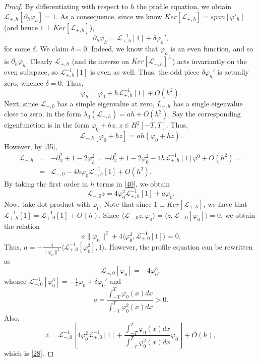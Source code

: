 \documentclass[12pt]{amsart}
\theoremstyle{definition}
\theoremstyle{remark}
\numberwithin{equation}{section}
\renewcommand{\(}{\left(}
\renewcommand{\)}{\right)}
\renewcommand{\[}{\left[}
\renewcommand{\]}{\right]}
\newcommand{\f}[2]{\frac{#1}{#2}}
\newcommand{\cl}{{\mathcal L}}
\newcommand{\de}{\delta}
\newcommand{\la}{\lambda}
\newcommand{\vp}{\varphi}
\newcommand{\dpr}[2]{\langle #1,#2 \rangle}
\newcommand{\p}{\partial}
\begin{document}
 \begin{proof}
 By differentiating with respect to $h$ the profile equation, we obtain $\cl_{+,h}[\p_h \vp_h]=1$. As a consequence, since we know $Ker[\cl_{+,h}]=span[\vp'_h]$ (and hence $1\perp Ker[\cl_{+,h}]$),
 $$
 \p_h\vp_h=\cl_{+,h}^{-1}[1]+\de \vp_h',
 $$
 for some $\de$. We claim $\de=0$. Indeed, we know that $\vp_h$ is an even function, and so is $\p_h \vp_h$. Clearly $\cl_{+,h}$ (and its inverse on $Ker[\cl_{+,h}]^\perp$)  acts invariantly on the even subspace, so $\cl_{+,h}^{-1}[1]$ is even as well. Thus, the odd piece $\de \vp_h'$ is actually zero, whence  $\de=0$. Thus,
 \begin{equation}
 \label{35}
 \vp_h=\vp_0+h \cl_{+,h}^{-1}[1]+O(h^2).
 \end{equation}
 Next, since $\cl_{-,0}$ has a simple eigenvalue at zero, $L_{-,h}$ has a single eigenvalue close to zero,
 in the form $\la_0(\cl_{-,h})=a h+O(h^2)$. Say the corresponding eigenfunction is in the form $\vp_0+ h z$,
 $z\in H^2[-T,T]$. Thus,
\begin{equation}
\label{40}
\cl_{-,h}[\vp_0+ h z]=a h(\vp_0+ h z).
\end{equation}
 However, by \eqref{35},
\begin{eqnarray*}
\cl_{-,h} &=&-\p_x^2+1-2\vp_h^2=-\p_x^2+1-2 \vp_0^2 - 4 h  \cl_{+,h}^{-1}[1] \vp^0  +O(h^2)= \\
&=&\cl_{-,0} - 4 h \vp_0   \cl_{+,h}^{-1}[1] +O(h^2).
\end{eqnarray*}
By taking the first order in $h$ terms in \eqref{40}, we obtain
$$
 \cl_{-,0} z =4 \vp_0^2  \cl_{+,h}^{-1}[1] +a \vp_0.
$$
 Now, take dot product with $\vp_0$. Note that since $1\perp Ker[\cl_{+,h}]$, we have that \\  $\cl_{+,h}^{-1}[1]=\cl_{+,0}^{-1}[1]+O(h)$. Since $\dpr{\cl_{-,0} z }{\vp_0}= \dpr{ z }{\cl_{-,0}[\vp_0]}=0$,
we obtain the relation
$$
a\|\vp_0\|^2+4 \dpr{\vp_0^3}{\cl_{+,0}^{-1}[1]}=0.
$$
Thus,
$
a=-\f{4}{\|\vp_0\|^2} \dpr{\cl_{+,0}^{-1}[\vp_0^3]}{1}.
$
However,  the profile equation can be rewritten as  $$\cl_{+,0}[\vp_0]=-4 \vp_0^3,$$
whence $\cl_{+,0}^{-1}[\vp_0^3]=-\f{1}{4} \vp_0+\de \vp_0'$ and
$$
a= \f{\int_{-T}^{T} \vp_0(x)dx}{\int_{-T}^{T} \vp_0^2 (x)dx}>0.
$$
Also,
$$
z=\cl_{-,0}^{-1}\left[4 \vp_0^2  \cl_{+,0}^{-1}[1] + \f{\int_{-T}^{T} \vp_0(x)dx}{\int_{-T}^{T} \vp_0^2 (x)dx}  \vp_0 \right]+O(h),
$$
which is \eqref{28}.
 \end{proof}
\end{document}
